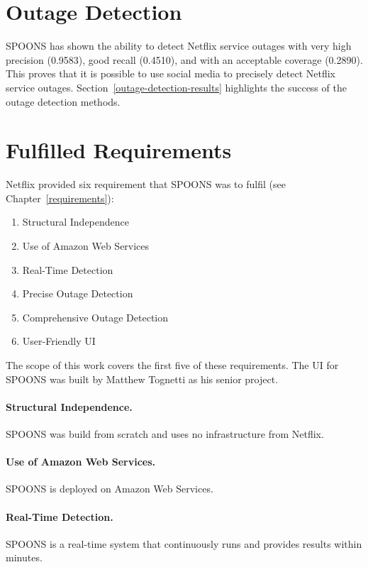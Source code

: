 \documentclass[12pt]{ucthesis}
\begin{document}
\section{Outage Detection}
\label{conclusions-conclusions-outage-detection}
SPOONS has shown the ability to detect Netflix service outages with very high precision (0.9583), good recall (0.4510), and with an acceptable coverage (0.2890).
This proves that it is possible to use social media to precisely detect Netflix service outages.
Section~\ref{outage-detection-results} highlights the success of the outage detection methods.

\section{Fulfilled Requirements}
\label{conclusions-conclusions-requirements}
Netflix provided six requirement that SPOONS was to fulfil (see Chapter~\ref{requirements}):
\begin{enumerate}
   \item Structural Independence
   \item Use of Amazon Web Services
   \item Real-Time Detection
   \item Precise Outage Detection
   \item Comprehensive Outage Detection
   \item User-Friendly UI
\end{enumerate}

The scope of this work covers the first five of these requirements.
The UI for SPOONS was built by Matthew Tognetti as his senior project.

\paragraph{Structural Independence.}
SPOONS was build from scratch and uses no infrastructure from Netflix.

\paragraph{Use of Amazon Web Services.}
SPOONS is deployed on Amazon Web Services.

\paragraph{Real-Time Detection.}
SPOONS is a real-time system that continuously runs and provides results within minutes.
\end{document}
